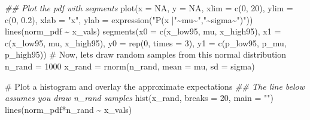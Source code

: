 \documentclass[
  letterpaper,
  DIV=11,
  numbers=noendperiod]{scrreprt}
\newenvironment{Shaded}{\begin{snugshade}}{\end{snugshade}}
\newcommand{\AttributeTok}[1]{\textcolor[rgb]{0.40,0.45,0.13}{#1}}
\newcommand{\CommentTok}[1]{\textcolor[rgb]{0.37,0.37,0.37}{#1}}
\newcommand{\ConstantTok}[1]{\textcolor[rgb]{0.56,0.35,0.01}{#1}}
\newcommand{\DecValTok}[1]{\textcolor[rgb]{0.68,0.00,0.00}{#1}}
\newcommand{\DocumentationTok}[1]{\textcolor[rgb]{0.37,0.37,0.37}{\textit{#1}}}
\newcommand{\FloatTok}[1]{\textcolor[rgb]{0.68,0.00,0.00}{#1}}
\newcommand{\FunctionTok}[1]{\textcolor[rgb]{0.28,0.35,0.67}{#1}}
\newcommand{\NormalTok}[1]{\textcolor[rgb]{0.00,0.23,0.31}{#1}}
\newcommand{\OtherTok}[1]{\textcolor[rgb]{0.00,0.23,0.31}{#1}}
\newcommand{\SpecialCharTok}[1]{\textcolor[rgb]{0.37,0.37,0.37}{#1}}
\newcommand{\StringTok}[1]{\textcolor[rgb]{0.13,0.47,0.30}{#1}}
\begin{document}
\begin{Shaded}
\begin{Highlighting}[]
\DocumentationTok{\#\# Plot the pdf with segments}
\FunctionTok{plot}\NormalTok{(}\AttributeTok{x =} \ConstantTok{NA}\NormalTok{, }\AttributeTok{y =} \ConstantTok{NA}\NormalTok{, }\AttributeTok{xlim =} \FunctionTok{c}\NormalTok{(}\DecValTok{0}\NormalTok{, }\DecValTok{20}\NormalTok{), }\AttributeTok{ylim =} \FunctionTok{c}\NormalTok{(}\DecValTok{0}\NormalTok{, }\FloatTok{0.2}\NormalTok{),}
     \AttributeTok{xlab =} \StringTok{"x"}\NormalTok{, }\AttributeTok{ylab =} \FunctionTok{expression}\NormalTok{(}\StringTok{"P(x |"}\SpecialCharTok{\textasciitilde{}}\NormalTok{mu}\SpecialCharTok{\textasciitilde{}}\StringTok{","}\SpecialCharTok{\textasciitilde{}}\NormalTok{sigma}\SpecialCharTok{\textasciitilde{}}\StringTok{")"}\NormalTok{))}
\FunctionTok{lines}\NormalTok{(norm\_pdf }\SpecialCharTok{\textasciitilde{}}\NormalTok{ x\_vals)}
\FunctionTok{segments}\NormalTok{(}\AttributeTok{x0 =} \FunctionTok{c}\NormalTok{(x\_low95, mu, x\_high95), }\AttributeTok{x1 =} \FunctionTok{c}\NormalTok{(x\_low95, mu, x\_high95),}
         \AttributeTok{y0 =} \FunctionTok{rep}\NormalTok{(}\DecValTok{0}\NormalTok{, }\AttributeTok{times =} \DecValTok{3}\NormalTok{), }\AttributeTok{y1 =} \FunctionTok{c}\NormalTok{(p\_low95, p\_mu, p\_high95))}
\CommentTok{\# Now, let\textquotesingle{}s draw random samples from this normal distribution}
\NormalTok{n\_rand }\OtherTok{=} \DecValTok{1000}
\NormalTok{x\_rand }\OtherTok{=} \FunctionTok{rnorm}\NormalTok{(n\_rand, }\AttributeTok{mean =}\NormalTok{ mu, }\AttributeTok{sd =}\NormalTok{ sigma)}

\CommentTok{\# Plot a histogram and overlay the approximate expectations}
\DocumentationTok{\#\# The line below assumes you draw \textquotesingle{}n\_rand\textquotesingle{} samples}
\FunctionTok{hist}\NormalTok{(x\_rand, }\AttributeTok{breaks =} \DecValTok{20}\NormalTok{, }\AttributeTok{main =} \StringTok{""}\NormalTok{)}
\FunctionTok{lines}\NormalTok{(norm\_pdf}\SpecialCharTok{*}\NormalTok{n\_rand }\SpecialCharTok{\textasciitilde{}}\NormalTok{ x\_vals)}
\end{Highlighting}
\end{Shaded}
\end{document}
